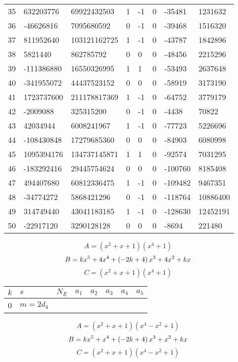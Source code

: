 \documentclass{amsart}
\begin{document}
\begin{longtable}{|l|l|l|lllll|}
35&632203776&69922432503&1&-1&0&-35481&1231632\\
36&-46626816&7095680592&0&-1&0&-39468&1516320\\
37&811952640&103121162725&1&-1&0&-43787&1842896\\
38&5821440&862785792&0&0&0&-48456&2215296\\
39&-111386880&16550326995&1&1&0&-53493&2637648\\
40&-341955072&44437523152&0&0&0&-58919&3173190\\
41&1723737600&211178817369&1&-1&0&-64752&3779179\\
42&-2009088&325315200&0&-1&0&-4438&70822\\
43&42034944&6008241967&1&-1&0&-77723&5226696\\
44&-108430848&17279685360&0&0&0&-84903&6080998\\
45&1095394176&134737145871&1&1&0&-92574&7031295\\
46&-183292416&29445754624&0&0&0&-100760&8185408\\
47&494407680&60812336475&1&-1&0&-109482&9467351\\
48&-34774272&5868421296&0&-1&0&-118764&10886400\\
49&314749440&43041183185&1&-1&0&-128630&12452191\\
50&-22917120&3290128128&0&0&0&-8694&221480\\
\hline
\end{longtable}
$$A=(x^2
 + x
 + 1)(x^4
 + 1)$$
$$B=k\*x^5
 + 4\*x^4
 + \left(-2\*k
 + 4\right) \*x^3
 + 4\*x^2
 + k\*x$$
$$C=(x^2
 + x
 + 1)(x^4
 + 1)$$
\begin{longtable}{|l|l|l|lllll|}
\hline
$k$ & $s$ & $N_E$ & $a_1$ & $a_2$ & $a_3$ & $a_4$ & $a_5$\\
\hline
0&$m=2d_{4}$&&\multicolumn{5}{c|}{}\\
\hline
\end{longtable}
$$A=(x^2
 + x
 + 1)(x^4
 - x^2
 + 1)$$
$$B=k\*x^5
 + x^4
 + \left(-2\*k
 + 4\right) \*x^3
 + x^2
 + k\*x$$
$$C=(x^2
 + x
 + 1)(x^4
 - x^2
 + 1)$$
\end{document}
